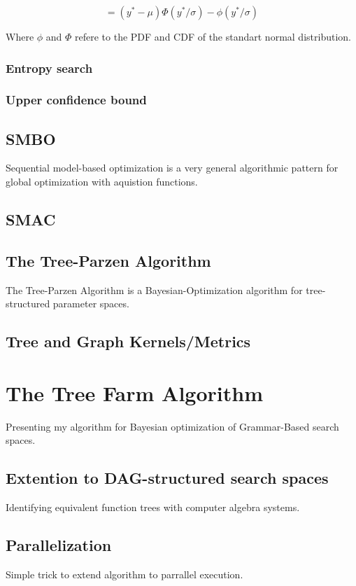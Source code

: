 \documentclass[english]{article}
\begin{document}
\begin{definition}[Topology]
$$ = (y^*-\mu)\Phi(y^*/\sigma) - \phi(y^*/\sigma) $$

Where $\phi$ and $\Phi$ refere to the PDF and CDF of the standart normal distribution.

\subsubsection{Entropy search}
\subsubsection{Upper confidence bound}

\subsection{SMBO}
Sequential model-based optimization is a very general algorithmic pattern for global optimization with aquistion functions.
\subsection{SMAC}


\subsection{The Tree-Parzen Algorithm}
The Tree-Parzen Algorithm \cite{bergstra_algorithms_2011} is a Bayesian-Optimization algorithm for tree-structured parameter spaces.

\subsection{Tree and Graph Kernels/Metrics}


\section{The Tree Farm Algorithm}
Presenting my algorithm for Bayesian optimization of Grammar-Based search spaces.

\subsection{Extention to DAG-structured search spaces}
Identifying equivalent function trees with computer algebra systems.

\subsection{Parallelization}
Simple trick to extend algorithm to parrallel execution.


\end{definition}
\end{document}
